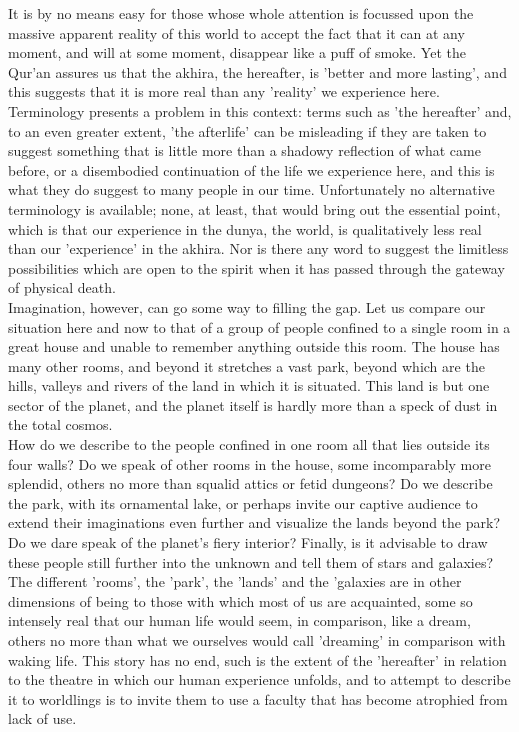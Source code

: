 \documentclass[10pt, twoside]{book}
\begin{document}
It is by no means easy for those whose whole attention is focussed upon the massive apparent reality 
of this world to accept the fact that it can at any moment, and will at some moment, disappear like a 
puff of smoke. Yet the Qur'an assures us that the akhira, the hereafter, is 'better and more 
lasting', and this suggests that it is more real than any 'reality' we experience here. Terminology 
presents a problem in this context: terms such as 'the hereafter' and, to an even greater extent, 
'the afterlife' can be misleading if they are taken to suggest something that is little more than a 
shadowy reflection of what came before, or a disembodied continuation of the life we experience here, 
and this is what they do suggest to many people in our time. Unfortunately no alternative terminology 
is available; none, at least, that would bring out the essential point, which is that our experience 
in the dunya, the world, is qualitatively less real than our 'experience' in the akhira. Nor is there 
any word to suggest the limitless possibilities which are open to the spirit when it has passed 
through the gateway of physical death. \\

Imagination, however, can go some way to filling the gap. Let us compare our situation here and now 
to that of a group of people confined to a single room in a great house and unable to remember 
anything outside this room. The house has many other rooms, and beyond it stretches a vast park, 
beyond which are the hills, valleys and rivers of the land in which it is situated. This land is but 
one sector of the planet, and the planet itself is hardly more than a speck of dust in the total 
cosmos. \\

How do we describe to the people confined in one room all that lies outside its four walls? Do we 
speak of other rooms in the house, some incomparably more splendid, others no more than squalid 
attics or fetid dungeons? Do we describe the park, with its ornamental lake, or perhaps invite our 
captive audience to extend their imaginations even further and visualize the lands beyond the park? 
Do we dare speak of the planet's fiery interior? Finally, is it advisable to draw these people still 
further into the unknown and tell them of stars and galaxies? \\

The different 'rooms', the 'park', the 'lands' and the 'galaxies are in other dimensions of being to 
those with which most of us are acquainted, some so intensely real that our human life would seem, in 
comparison, like a dream, others no more than what we ourselves would call 'dreaming' in comparison 
with waking life. This story has no end, such is the extent of the 'hereafter' in relation to the 
theatre in which our human experience unfolds, and to attempt to describe it to worldlings is to 
invite them to use a faculty that has become atrophied from lack of use. \\
\end{document}
